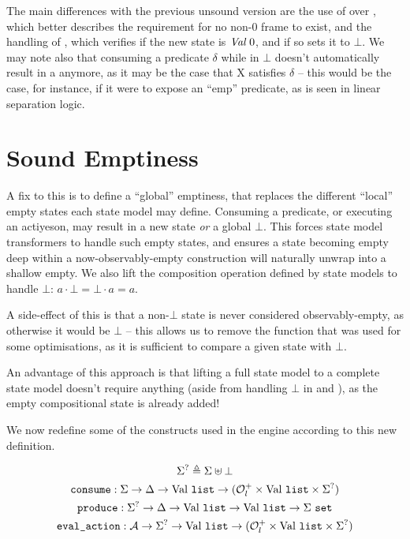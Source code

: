 The main differences with the previous unsound version are the use of \isexowned over , which better describes the requirement for no non-0 frame to exist, and the handling of , which verifies if the new state is $\textit{Val}~0$, and if so sets it to $\bot$. We may note also that consuming a predicate $\delta$ while in $\bot$ doesn't automatically result in a \Miss anymore, as it may be the case that X satisfies $\delta$ -- this would be the case, for instance, if it were to expose an ``emp'' predicate, as is seen in linear separation logic.

\section{Sound Emptiness}

A fix to this is to define a ``global'' emptiness, that replaces the different ``local'' empty states each state model may define. Consuming a predicate, or executing an actiyeson, may result in a new state {\it or} a global $\bot$. This forces state model transformers to handle such empty states, and ensures a state becoming empty deep within a now-observably-empty construction will naturally unwrap into a shallow empty. We also lift the composition operation defined by state models to handle $\bot$: $a \cdot \bot = \bot \cdot a = a$.

A side-effect of this is that a non-$\bot$ state is never considered observably-empty, as otherwise it would be $\bot$ -- this allows us to remove the  function that was used for some optimisations, as it is sufficient to compare a given state with $\bot$.

An advantage of this approach is that lifting a full state model to a complete state model doesn't require anything (aside from handling $\bot$ in  and ), as the empty compositional state is already added!

We now redefine some of the constructs used in the engine according to this new definition.

\begin{gather*}
	\Sigma^? \triangleq \Sigma \uplus \bot\\
	\texttt{consume}:\Sigma \rightarrow \Delta \rightarrow \text{Val}~\texttt{list} \rightarrow (\mathcal O^+_l \times \text{Val}~\texttt{list} \times \Sigma^?) \\
	\texttt{produce}:\Sigma^? \rightarrow \Delta \rightarrow \text{Val}~\texttt{list} \rightarrow \text{Val}~\texttt{list} \rightarrow \Sigma~\texttt{set}\\
	\texttt{eval\_action}: {\cal A} \rightarrow \Sigma^? \rightarrow \text{Val}~\texttt{list} \rightarrow (\mathcal O^+_l \times \text{Val}~\texttt{list} \times \Sigma^?)
\end{gather*}

